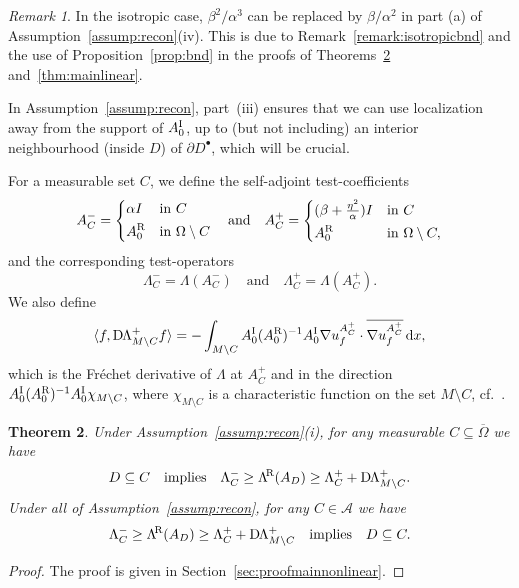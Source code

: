 \documentclass[reqno]{amsart}
\numberwithin{equation}{section}
\numberwithin{figure}{section}
\numberwithin{table}{section}
\theoremstyle{plain}
\newtheorem{theorem}{Theorem}[section]
\theoremstyle{definition}
\theoremstyle{remark}
\newtheorem{remark}[theorem]{Remark}
\newcommand{\inner}[1]{\langle#1\rangle}
\newcommand{\di}{\mathrm{d}}   %
\newcommand{\upR}{^{\textup{R}}}
\newcommand{\upI}{^{\textup{I}}}
\newcommand{\uptR}{^{\!\textup{R}}}
\newcommand{\LambdaR}{\Lambda\uptR}
\newcommand{\AR}{A\upR}
\newcommand{\AI}{A\upI}
\newcommand{\DLambda}{\textup{D}\mkern-1.5mu \Lambda}
\begin{document}
	\begin{remark}
		In the isotropic case, $\beta^2/\alpha^3$ can be replaced by $\beta/\alpha^2$ in part (a) of Assumption~\ref{assump:recon}(iv). This is due to Remark~\ref{remark:isotropicbnd} and the use of Proposition~\ref{prop:bnd} in the proofs of Theorems~\ref{thm:mainnonlinear} and~\ref{thm:mainlinear}.
	\end{remark}
	
	In Assumption~\ref{assump:recon}, part~(iii) ensures that we can use localization away from the support of $\AI_0$, up to (but not including) an interior neighbourhood (inside $D$) of $\partial D^\bullet$, which will be crucial. 
	
	For a measurable set $C$, we define the self-adjoint test-coefficients
	\begin{equation*}
		A^-_{C} = \begin{dcases}
			\alpha I & \text{in } C \\
			\AR_0 & \text{in } \Omega\setminus C
		\end{dcases}
		\quad 
		\text{and}
		\quad
		A^+_{C} = \begin{dcases}
			(\beta+\tfrac{\eta^2}{\alpha}) I & \text{in } C \\
			\AR_0 & \text{in } \Omega\setminus C,
		\end{dcases}
	\end{equation*}
	and the corresponding test-operators
	\begin{equation*}
		\Lambda^-_C = \Lambda(A^-_C) \quad \text{and}\quad \Lambda^+_C = \Lambda(A^+_C).
	\end{equation*}
	We also define
	\begin{equation*}
		\inner{f, \DLambda_{M\setminus C}^+ f} = -\int_{M\setminus C} \AI_0(\AR_0)^{-1}\AI_0\nabla u_f^{A_C^+}\cdot\overline{\nabla u_f^{A_C^+}}\,\di x,
	\end{equation*}
	which is the Fr\'echet derivative of $\Lambda$ at $A_C^+$ and in the direction $\AI_0(\AR_0)^{-1}\AI_0\chi_{M\setminus C}$, where $\chi_{M\setminus C}$ is a characteristic function on the set $M\setminus C$, cf.~\cite{Garde2022c}.
	
	\begin{theorem} \label{thm:mainnonlinear}
		Under Assumption~\ref{assump:recon}(i), for any measurable $C\subseteq \overline{\Omega}$ we have
		\begin{equation*}
			D \subseteq C \quad \text{implies} \quad \Lambda^-_{C} \geq \LambdaR(A_D) \geq \Lambda^+_{C}+\DLambda_{M\setminus C}^+.
		\end{equation*}
		Under all of Assumption~\ref{assump:recon}, for any $C\in\mathcal{A}$ we have
		\begin{equation*}
			\Lambda^-_{C} \geq \LambdaR(A_D) \geq \Lambda^+_{C}+\DLambda_{M\setminus C}^+ \quad \text{implies} \quad D \subseteq C.
		\end{equation*}
	\end{theorem}
	\begin{proof}
		The proof is given in Section~\ref{sec:proofmainnonlinear}.
	\end{proof}
	
\end{document}
